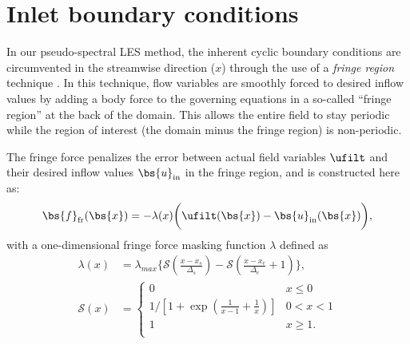 \section{Inlet boundary conditions}\label{sec:meth_fringe}
In our pseudo-spectral LES method, the inherent cyclic boundary conditions are circumvented in the streamwise direction ($x$) through the use of a \emph{fringe region} technique \citep{spalart1993experimental,lundbladh1999efficient,nordstrom1999fringe}. In this technique, flow variables are smoothly forced to desired inflow values by adding a body force to the governing equations in a so-called ``fringe region'' at the back of the domain. This allows the entire field to stay periodic while the region of interest (the domain minus the fringe region) is non-periodic.

The fringe force penalizes the error between actual field variables $\ufilt$ and their desired inflow values $\bs{u}_\text{in}$ in the fringe region, and is constructed here as:
\begin{equation}\label{eq:fringeforcing}
	\bs{f}_{\text{fr}}(\bs{x}) =  - \lambda(x) \bigg(\ufilt(\bs{x}) - \bs{u}_{\text{in}}(\bs{x})  \bigg),
\end{equation}
with a one-dimensional fringe force masking function $\lambda$ defined as \citep{lundbladh1999efficient}
\begin{align}
\lambda(x) &= \lambda_{max} \bigg \{ \mathcal{S}\left( \frac{x - x_s}{\Delta_s} \right) - \mathcal{S} \left( \frac{x - x_e}{\Delta_e} + 1 \right) \bigg \} \nonumber,\\
\mathcal{S}(x) &=
\begin{cases}
0                  & x \le 0        \\
1/[1 + \exp(\frac{1}{x-1} + \frac{1}{x})]             & 0 < x < 1   \\
1                        & x \ge 1 .  \\
\end{cases} \label{eq:lambda}
\end{align}
